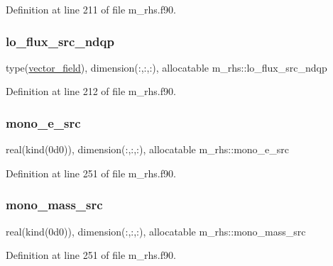 Definition at line 211 of file m\+\_\+rhs.\+f90.

\mbox{\label{namespacem__rhs_abb201391897c33f0eb782f74f88d4ec0}} 
\subsubsection{\texorpdfstring{lo\+\_\+flux\+\_\+src\+\_\+ndqp}{lo\_flux\_src\_ndqp}}
{\footnotesize\ttfamily type(\hyperlink{structm__derived__types_1_1vector__field}{vector\+\_\+field}), dimension(\+:,\+:,\+:), allocatable m\+\_\+rhs\+::lo\+\_\+flux\+\_\+src\+\_\+ndqp}



Definition at line 212 of file m\+\_\+rhs.\+f90.

\mbox{\label{namespacem__rhs_a307adefdd895260e42e85872aa306929}} 
\subsubsection{\texorpdfstring{mono\+\_\+e\+\_\+src}{mono\_e\_src}}
{\footnotesize\ttfamily real(kind(0d0)), dimension(\+:,\+:,\+:), allocatable m\+\_\+rhs\+::mono\+\_\+e\+\_\+src}



Definition at line 251 of file m\+\_\+rhs.\+f90.

\mbox{\label{namespacem__rhs_acfcb0aeeb4659d44b0dd6fbf0b82ee79}} 
\subsubsection{\texorpdfstring{mono\+\_\+mass\+\_\+src}{mono\_mass\_src}}
{\footnotesize\ttfamily real(kind(0d0)), dimension(\+:,\+:,\+:), allocatable m\+\_\+rhs\+::mono\+\_\+mass\+\_\+src}



Definition at line 251 of file m\+\_\+rhs.\+f90.

